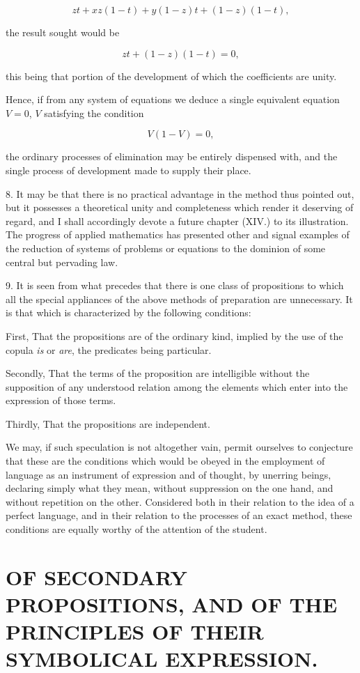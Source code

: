 \documentclass[oneside]{book}
\begin{document}
\[
zt + xz(1 - t) + y (1 - z) t + (1 - z) (1 - t),
\]

the result sought would be

\[
zt + (1 - z) (1 - t) = 0,
\]

this being that portion of the development of which the coefficients are unity.

Hence, if from any system of equations we deduce a single
equivalent equation $V = 0$, $V$ satisfying the condition

\[
V(1 - V) = 0,
\]

the ordinary processes of elimination may be entirely dispensed
with, and the single process of development made to supply
their place.

8. It may be that there is no practical advantage in the method
thus pointed out, but it possesses a theoretical unity and
completeness which render it deserving of regard, and I shall accordingly
devote a future chapter (XIV.) to its illustration. The
progress of applied mathematics has presented other and signal
examples of the reduction of systems of problems or equations to
the dominion of some central but pervading law.

9. It is seen from what precedes that there is one class of
propositions to which all the special appliances of the above methods
of preparation are unnecessary. It is that which is characterized
by the following conditions:

First, That the propositions are of the ordinary kind, implied
by the use of the copula \textit{is} or \textit{are}, the predicates being particular.

Secondly, That the terms of the proposition are intelligible
without the supposition of any understood relation among the
elements which enter into the expression of those terms.

Thirdly, That the propositions are independent.

We may, if such speculation is not altogether vain, permit
ourselves to conjecture that these are the conditions which would
be obeyed in the employment of language as an instrument of
expression and of thought, by unerring beings, declaring simply
what they mean, without suppression on the one hand, and without
repetition on the other. Considered both in their relation
to the idea of a perfect language, and in their relation to the processes
of an exact method, these conditions are equally worthy
of the attention of the student.

\chapter[OF SECONDARY PROPOSITIONS]
{\large OF SECONDARY PROPOSITIONS, AND OF THE PRINCIPLES OF THEIR
SYMBOLICAL EXPRESSION.}
\end{document}
